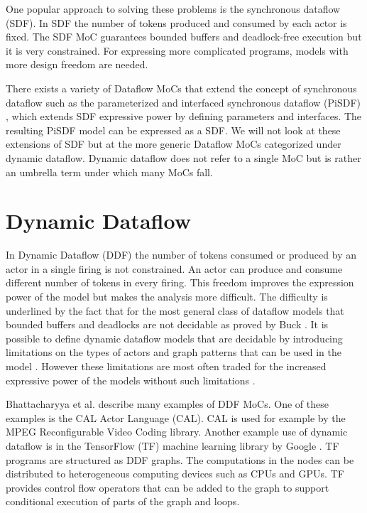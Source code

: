 \documentclass[conference,a4paper]{IEEEtran}
\begin{document}
One popular approach to solving these problems is the synchronous dataflow
(SDF). In SDF the number of tokens produced and consumed by each actor is fixed.
The SDF MoC guarantees bounded buffers and deadlock-free execution but it is
very constrained. For expressing more complicated programs, models with more
design freedom are needed. \cite{lee2015introduction}

There exists a variety of Dataflow MoCs that extend the concept of synchronous
dataflow such as the parameterized and interfaced synchronous dataflow (PiSDF)
\cite{desnos2013pimm}, which extends SDF expressive power by defining parameters
and interfaces. The resulting PiSDF model can be expressed as a SDF. We will not
look at these extensions of SDF but at the more generic Dataflow MoCs
categorized under dynamic dataflow. Dynamic dataflow does not refer to a single
MoC but is rather an umbrella term under which many MoCs fall.

\section{Dynamic Dataflow}
In Dynamic Dataflow (DDF) the number of tokens consumed or produced by an actor
in a single firing is not constrained. An actor can produce and consume
different number of tokens in every firing. This freedom improves the expression
power of the model but makes the analysis more difficult. The difficulty is
underlined by the fact that for the most general class of dataflow models that
bounded buffers and deadlocks are not decidable as proved by Buck
\cite{buck1993scheduling}. It is possible to define dynamic dataflow models that
are decidable by introducing limitations on the types of actors and graph
patterns that can be used in the model \cite{bhattacharyya2013handbook,
gao1992well}. However these limitations are most often traded for the increased
expressive power of the models without such limitations
\cite{bhattacharyya2013handbook}.

Bhattacharyya et al. \cite{bhattacharyya2013handbook} describe many examples of
DDF MoCs. One of these examples is the CAL Actor Language (CAL). CAL is used for
example by the MPEG Reconfigurable Video Coding library. Another example use of
dynamic dataflow is in the TensorFlow (TF) machine learning library by Google
\cite{tensorflow2015-whitepaper}. TF programs are structured as DDF graphs. The
computations in the nodes can be distributed to heterogeneous computing devices
such as CPUs and GPUs. TF provides control flow operators that can be added to
the graph to support conditional execution of parts of the graph and loops.
\end{document}
